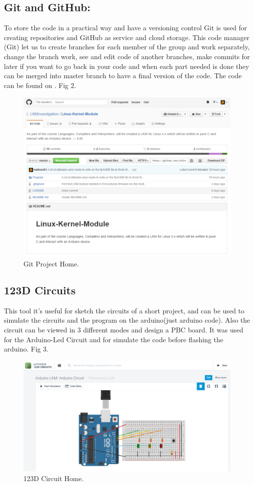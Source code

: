 \documentclass[12pt]{article}
\begin{document}
\subsection{Git and GitHub:}
To store the code in a practical way and have a versioning control Git is used  for creating repositories and GitHub as service and cloud storage. This code manager (Git) let us to create branches for each member of the group and work separately, change the branch work, see and edit code of another branches, make commits for later if you want to go back in your code and when each part needed is done they can be merged into master branch to have a final version of the code. The code can be found on \cite{Chin-Dav16b}. Fig 2.
\begin{figure}[h!]
 	\centering
  	\includegraphics[scale=0.5]
  	{Fig/git.png}    
  	\caption{Git Project Home.}
\end{figure}
\subsection{123D Circuits}
This tool it's useful for sketch the circuits of a short project, and can be used to simulate the circuits and the program on the arduino(just arduino code). Also the circuit can be viewed in 3 different modes and design a PBC board. It was used for the Arduino-Led Circuit and for simulate the code before flashing the arduino. Fig 3. 
\begin{figure}[h!]
 	\centering
  	\includegraphics[scale=0.4]
  	{Fig/123D-Circuits.png}    
  	\caption{123D Circuit Home.}
\end{figure}
\end{document}
